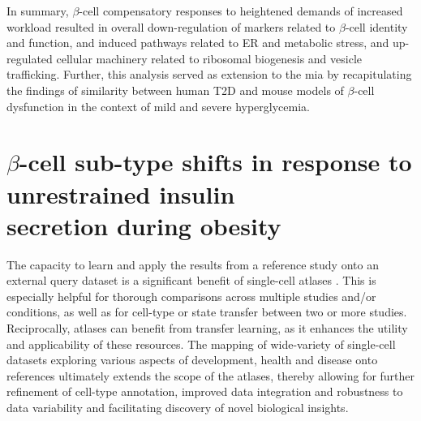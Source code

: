 In summary, $\beta$-cell compensatory responses to heightened demands of increased workload resulted in overall down-regulation of markers related to $\beta$-cell identity and function, and induced pathways related to ER and metabolic stress,  and up-regulated cellular machinery related to ribosomal biogenesis and  vesicle trafficking. Further, this analysis served as extension to the \gls{mia} by recapitulating the findings of similarity between human T2D and mouse models of $\beta$-cell dysfunction in the context of mild and severe hyperglycemia. %

\clearpage

\section[$\beta$-cell sub-type shifts in response to unrestrained insulin secretion during obesity]{$\beta$-cell sub-type shifts in response to unrestrained insulin\\secretion during obesity}
\label{sec:chp3_validation}


\par The capacity to learn and apply the results from a reference study onto an external query dataset is a significant benefit of single-cell atlases \textbf{\cite{lotfollahi_mapping_2021,lotfollahi_biologically_2023,ye_mapping_2024}}. This is especially helpful for thorough comparisons across multiple studies and/or conditions, as well as for cell-type or state transfer between two or more studies. Reciprocally, atlases can benefit from transfer learning, as it enhances the utility and applicability of these resources. The mapping of wide-variety of single-cell datasets exploring various aspects of development, health and disease onto references ultimately extends the scope of the atlases, thereby allowing for further refinement of cell-type annotation, improved data integration and robustness to data variability and facilitating discovery of novel biological insights.\\

